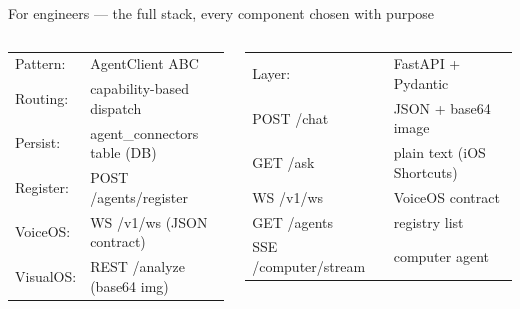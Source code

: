 \documentclass[aspectratio=169, 10pt]{beamer}
\begin{document}
\begin{frame}{For engineers — the full stack, every component chosen with purpose}
\begin{columns}[T]
      \begin{tcolorbox}[greencard, title={\faProjectDiagram\; Multi-Agent Protocol}]
        \scriptsize\ttfamily
        \begin{tabular}{@{}ll@{}}
          Pattern:  & AgentClient ABC \\
          Routing:  & capability-based dispatch \\
          Persist:  & agent\_connectors table (DB) \\
          Register: & POST /agents/register \\
          VoiceOS:  & WS /v1/ws (JSON contract) \\
          VisualOS: & REST /analyze (base64 img) \\
        \end{tabular}
      \end{tcolorbox}
      \vspace{4pt}
      \begin{tcolorbox}[ambercard, title={\faServer\; API Surface}]
        \scriptsize\ttfamily
        \begin{tabular}{@{}ll@{}}
          Layer:          & FastAPI + Pydantic \\
          POST /chat      & JSON + base64 image \\
          GET  /ask       & plain text (iOS Shortcuts) \\
          WS   /v1/ws     & VoiceOS contract \\
          GET  /agents    & registry list \\
          SSE  /computer/stream & computer agent \\
        \end{tabular}
      \end{tcolorbox}
  \end{columns}
\end{frame}
\end{document}

